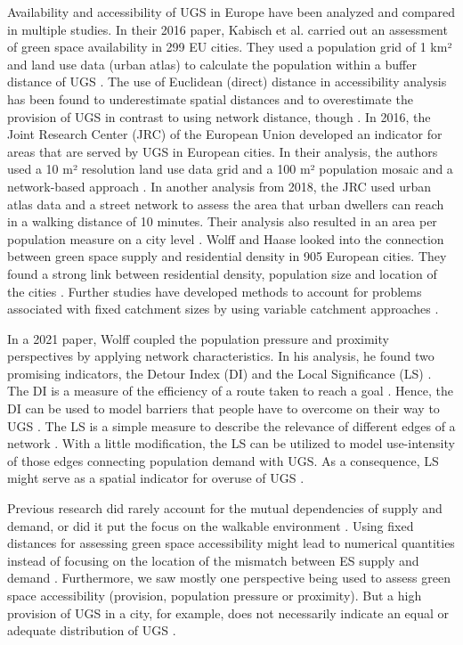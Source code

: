 \documentclass[10pt]{article}
\begin{document}
Availability and accessibility of UGS in Europe have been analyzed and compared in multiple studies.
In their 2016 paper, Kabisch et al. carried out an assessment of green space availability in 299 EU cities. They used a population grid of 1 km² and land use data (urban atlas) to calculate the population within a buffer distance of UGS \citep{Kabisch.2016}.
The use of Euclidean (direct) distance in accessibility analysis has been found to underestimate spatial distances and to overestimate the provision of UGS in contrast to using network distance, though \citep{Sander.2010, Moseley.2013}.
In 2016, the Joint Research Center (JRC) of the European Union developed an indicator for areas that are served by UGS in European cities. In their analysis, the authors used a 10 m² resolution land use data grid and a 100 m² population mosaic and a network-based approach \citep{Pafi.2016}.
In another analysis from 2018, the JRC used urban atlas data and a street network to assess the area that urban dwellers can reach in a walking distance of 10 minutes. Their analysis also resulted in an area per population measure on a city level \citep{Poelman.2018}.
Wolff and Haase looked into the connection between green space supply and residential density in 905 European cities. They found a strong link between residential density, population size and location of the cities \citep{Wolff.2019}.
Further studies have developed methods to account for problems associated with fixed catchment sizes by using variable catchment approaches \citep{Luo.2012}.

In a 2021 paper, Wolff coupled the population pressure and proximity perspectives by applying network characteristics. In his analysis, he found two promising indicators, the Detour Index (DI) and the Local Significance (LS) \citep{Wolff.2021}.
The DI is a measure of the efficiency of a route taken to reach a goal \citep{Barthelemy.2018}.
Hence, the DI can be used to model barriers that people have to overcome on their way to UGS \citep{Wolff.2021}.
The LS is a simple measure to describe the relevance of different edges of a network \citep{Esch.2014}.
With a little modification, the LS can be utilized to model use-intensity of those edges connecting population demand with UGS. As a consequence, LS might serve as a spatial indicator for overuse of UGS \citep{Wolff.2021}.

Previous research did rarely account for the mutual dependencies of supply and demand, or did it put the focus on the walkable environment \citep{Syrbe.2017}.
Using fixed distances for assessing green space accessibility might lead to numerical quantities instead of focusing on the location of the mismatch between ES supply and demand \citep{Higgs.2012, Syrbe.2017}.
Furthermore, we saw mostly one perspective being used to assess green space accessibility (provision, population pressure or proximity).
But a high provision of UGS in a city, for example, does not necessarily indicate an equal or adequate distribution of UGS \citep{Poelman.2018}.
\end{document}
